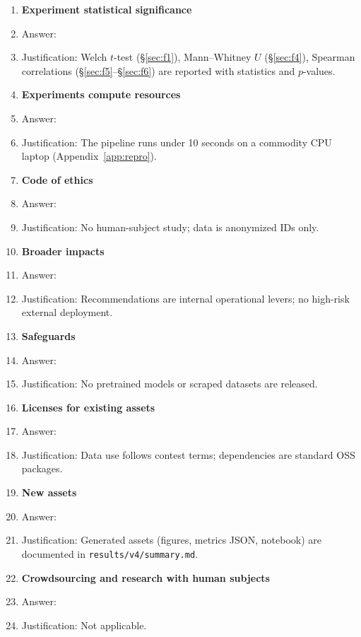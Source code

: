 \documentclass{article}
\begin{document}
\begin{enumerate}
\item {\bf Experiment statistical significance}
    \item[] Answer: \answerYes{}
    \item[] Justification: Welch $t$-test (\S\ref{sec:f1}), Mann--Whitney $U$ (\S\ref{sec:f4}), Spearman correlations (\S\ref{sec:f5}--\S\ref{sec:f6}) are reported with statistics and $p$-values.

\item {\bf Experiments compute resources}
    \item[] Answer: \answerYes{}
    \item[] Justification: The pipeline runs under 10 seconds on a commodity CPU laptop (Appendix~\ref{app:repro}).

\item {\bf Code of ethics}
    \item[] Answer: \answerYes{}
    \item[] Justification: No human-subject study; data is anonymized IDs only.

\item {\bf Broader impacts}
    \item[] Answer: \answerYes{}
    \item[] Justification: Recommendations are internal operational levers; no high-risk external deployment.

\item {\bf Safeguards}
    \item[] Answer: \answerNA{}
    \item[] Justification: No pretrained models or scraped datasets are released.

\item {\bf Licenses for existing assets}
    \item[] Answer: \answerYes{}
    \item[] Justification: Data use follows contest terms; dependencies are standard OSS packages.

\item {\bf New assets}
    \item[] Answer: \answerYes{}
    \item[] Justification: Generated assets (figures, metrics JSON, notebook) are documented in \texttt{results/v4/summary.md}.

\item {\bf Crowdsourcing and research with human subjects}
    \item[] Answer: \answerNA{}
    \item[] Justification: Not applicable.


\end{enumerate}
\end{document}
